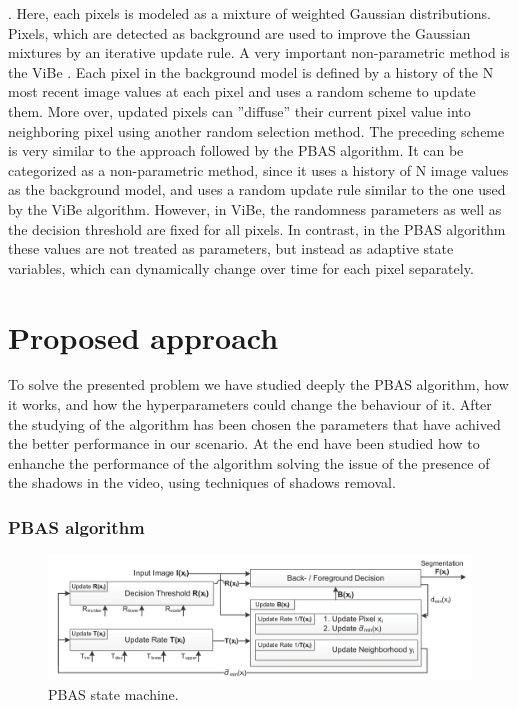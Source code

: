 \cite{gmm}. Here, each pixels is modeled as a mixture of weighted Gaussian distributions. Pixels, which
are detected as background are used to improve the Gaussian mixtures by an iterative update rule. A very
important non-parametric method is the ViBe \cite{vibe}. Each pixel in the background model is defined by
a history of the N most recent image values at each pixel and uses a random scheme to update them.
More over, updated pixels can ”diffuse” their current pixel value into neighboring pixel using another
random selection method. The preceding scheme is very similar to the approach followed by the PBAS algorithm.
It can be categorized as a non-parametric method, since it uses a history of N image values as the background
model, and uses a random update rule similar to the one used by the ViBe algorithm. However, in ViBe, the
randomness parameters as well as the decision threshold are fixed for all pixels. In contrast, in the PBAS
algorithm these values are not treated as parameters, but instead as adaptive state variables, which can
dynamically change over time for each pixel separately.


\section*{Proposed approach}
To solve the presented problem we have studied deeply the PBAS algorithm, how it works, and how the hyperparameters could change the behaviour of it. After the studying of the algorithm has been chosen the parameters that have achived the better performance in our scenario. At the end have been studied how to enhanche the performance of the algorithm solving the issue of the presence of the shadows in the video, using techniques of shadows removal.
\subsubsection{PBAS algorithm}

\begin{figure}
  \includegraphics[width=\textwidth]{Figures/PBAS_state_machine.png}
  \caption{PBAS state machine.}
\end{figure}

